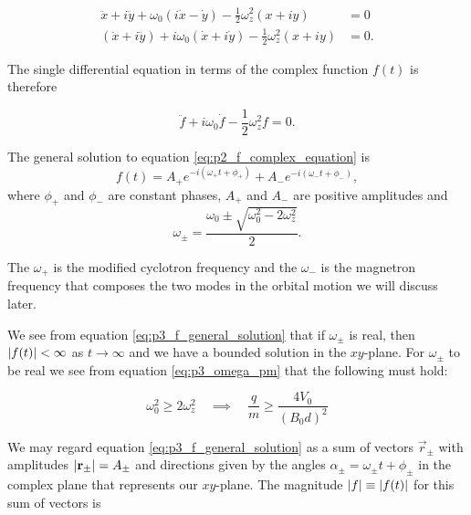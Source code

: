 \begin{equation}\label{eq:p2_eom_rewritten}
    \begin{split}
    \ddot{x} + i\ddot{y} + \omega_0(i\dot{x} - \dot{y}) -\frac{1}{2}\omega_z^2(x+iy) &= 0 \\
    (\ddot{x} + i\ddot{y}) + i\omega_0(\dot{x} +i \dot{y}) -\frac{1}{2}\omega_z^2(x+iy) &= 0. 
    \end{split}
\end{equation}

The single differential equation in terms of the complex function $f(t)$ is therefore

\begin{equation}
    \ddot{f} + i\omega_0 \dot{f} - \frac{1}{2}\omega_z^2 f = 0. \label{eq:p2_f_complex_equation}
\end{equation}

The general solution to equation \eqref{eq:p2_f_complex_equation} is 
\begin{equation}
    f(t) = A_+ e^{-i(\omega_+ t + \phi_+)} + A_- e^{-i(\omega_- t + \phi_-)}, \label{eq:p3_f_general_solution}
\end{equation}
where $\phi_+$ and $\phi_-$ are constant phases, $A_+$ and $A_-$ are positive amplitudes and 
\begin{equation}
    \omega_\pm = \frac{\omega_0 \pm \sqrt{\omega_0^2 - 2\omega_z^2}}{2}. \label{eq:p3_omega_pm}
\end{equation}

The $\omega_+$ is the modified cyclotron frequency and the $\omega_-$ is the magnetron frequency that composes the two modes in the orbital motion we will discuss later.


We see from equation \eqref{eq:p3_f_general_solution} that if $\omega_\pm$ is real, then $\abs{f(t)} < \infty$ as $t\to\infty$ and we have a bounded solution in the $xy$-plane. For $\omega_\pm$ to be real we see from equation \eqref{eq:p3_omega_pm} that the following must hold:

\begin{equation}\label{eq:p3_omega_constraints}
    \omega_0^2 \geq 2\omega_z^2  \quad \implies \quad \frac{q}{m} \geq \frac{4V_0}{(B_0d)^2}
\end{equation} 

We may regard equation \eqref{eq:p3_f_general_solution} as a sum of vectors $\vec{r}_\pm$ with amplitudes $\abs{\mathbf{r}_\pm}=A_\pm$ and directions given by the angles $\alpha_\pm = \omega_\pm t + \phi_\pm$ in the complex plane that represents our $xy$-plane. The magnitude $\abs{f} \equiv \abs{f(t)}$ for this sum of vectors is

